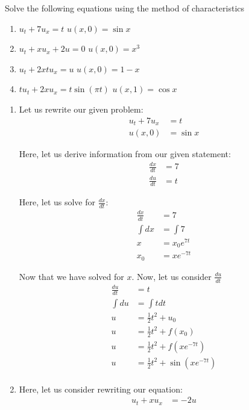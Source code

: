 \item Solve the following equations using the method of characteristics
\begin{enumerate}
  \item $u_t + 7u_x = t$ \quad $u(x, 0) = \sin x$
  \item $u_t + xu_x + 2u = 0$ \quad $u(x, 0) = x^3$
  \item $u_t + 2xtu_x = u$ \quad $u(x, 0) = 1 - x$
  \item $tu_t + 2xu_x = t\sin(\pi t)$ \quad $u(x, 1) = \cos x$
\end{enumerate}
\bigbreak

\begin{enumerate}
  \item Let us rewrite our given problem:
  \begin{align}
    u_t + 7u_x & = t\\
    u(x, 0) & = \sin x
  \end{align}

  Here, let us derive information from our given statement:
  \begin{align}
    \frac{dx}{dt} & = 7\\
    \frac{du}{dt} & = t
  \end{align}

  Here, let us solve for $\frac{dx}{dt}$:
  \begin{align}
    \frac{dx}{dt} & = 7\\
    \int dx & = \int 7\\
    x & = x_0 e^{7t}\\
    x_0 & = x e^{-7t}
  \end{align}

  Now that we have solved for $x$. Now, let us consider $\frac{du}{dt}$
  \begin{align}
    \frac{du}{dt} &= t\\
    \int du & = \int t dt\\
    u & = \frac{1}{2} t^2 + u_0\\
    u & = \frac{1}{2} t^2 + f(x_0)\\
    u & = \frac{1}{2} t^2 + f\left(x e^{-7t}\right)\\
    u & = \frac{1}{2} t^2 + \sin \left(x e^{-7t}\right)\\
  \end{align}

  \item Here, let us consider rewriting our equation:
  \begin{align}
    u_t + xu_x & = -2u
  \end{align}


\end{enumerate}
